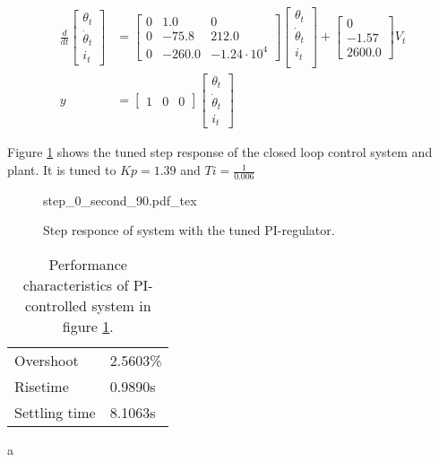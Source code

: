 \documentclass[../../../Main]{subfiles}
\begin{document}
\begin{equation}
      \label{eq:90_linearized}
      \begin{split}
      \frac{d}{dt}
    \begin{bmatrix}
        \theta_t \\
        \dot \theta_t \\
        i_t
    \end{bmatrix}
    &=
    \begin{bmatrix}0 & 1.0 & 0\\ 0  & -75.8 & 212.0\\ 0 & -260.0 & -1.24 \cdot 10^4 \end{bmatrix}
    \begin{bmatrix}
        \theta_t \\
        \dot \theta_t \\
        i_t \\
    \end{bmatrix}
    +
    \begin{bmatrix}
     0\\ -1.57\\ 2600.0
    \end{bmatrix}
    V_t \\
		y &=
    \begin{bmatrix}
        1 & 0 & 0
    \end{bmatrix}
    \begin{bmatrix}
        \theta_t \\
        \dot \theta_t\\
        i_t
    \end{bmatrix}
    \end{split}
\end{equation}

Figure \ref{fig:step_0_second_90} shows the tuned step response of the closed loop control system and plant.
It is tuned to $Kp = 1.39$ and $Ti = \frac{1}{0.006}$
\begin{figure}[H]
\centering
\def\svgwidth{\textwidth}
{step_0_second_90.pdf_tex}
\caption{Step responce of system with the tuned PI-regulator.}
\label{fig:step_0_second_90}
\end{figure}


\begin{table}[h]
	 \centering
	 \begin{tabular}{ll}
		 Overshoot & 2.5603\%\\
		 Risetime  & 0.9890s\\
		 Settling time & 8.1063s
	 \end{tabular}
	 \caption{Performance characteristics of PI-controlled system in figure \ref{fig:step_0_second_90}.}
	 \label{tab:performance_0_3}a
\end{table}
\end{document}
